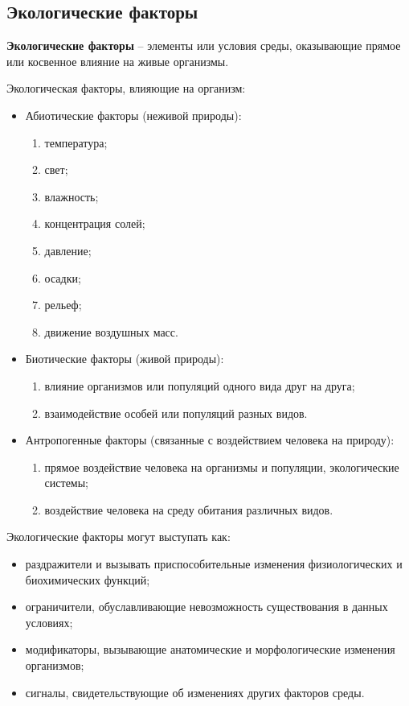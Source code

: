 \documentclass[a5paper, 11pt]{extarticle}
\theoremstyle{definition}
\theoremstyle{definition}
\theoremstyle{definition}
\numberwithin{figure}{section}
\begin{document}
\subsection{Экологические факторы}

\textbf{Экологические факторы} -- элементы или условия среды, оказывающие прямое или косвенное влияние на живые организмы.

Экологическая факторы, влияющие на организм:
\begin{itemize}
    \item
          Абиотические факторы (неживой природы):
          \begin{enumerate}
              \item температура;
              \item свет;
              \item влажность;
              \item концентрация солей;
              \item давление;
              \item осадки;
              \item рельеф;
              \item движение воздушных масс.
          \end{enumerate}
    \item
          Биотические факторы (живой природы):
          \begin{enumerate}
              \item влияние организмов или популяций одного вида друг на друга;
              \item взаимодействие особей или популяций разных видов.
          \end{enumerate}
    \item
          Антропогенные факторы (связанные с воздействием человека на природу):
          \begin{enumerate}
              \item прямое воздействие человека на организмы и популяции, экологические системы;
              \item воздействие человека на среду обитания различных видов.
          \end{enumerate}
\end{itemize}

Экологические факторы могут выступать как:
\begin{itemize}
    \item раздражители и вызывать приспособительные изменения физиологических и биохимических функций;
    \item ограничители, обуславливающие невозможность существования в данных условиях;
    \item модификаторы, вызывающие анатомические и морфологические изменения организмов;
    \item сигналы, свидетельствующие об изменениях других факторов среды.
\end{itemize}
\end{document}
